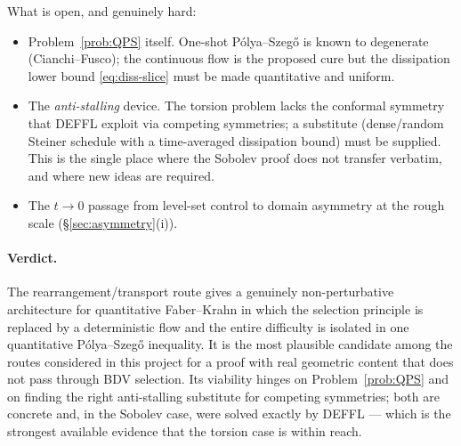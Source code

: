 \documentclass[11pt]{article}
\theoremstyle{definition}
\begin{document}
What is open, and genuinely hard:
\begin{itemize}[leftmargin=2em]
\item Problem~\ref{prob:QPS} itself. One-shot Pólya--Szegő is known to
degenerate (Cianchi--Fusco); the continuous flow is the proposed cure but the
dissipation lower bound \eqref{eq:diss-slice} must be made quantitative and
uniform.
\item The \emph{anti-stalling} device. The torsion problem lacks the
conformal symmetry that DEFFL exploit via competing symmetries; a substitute
(dense/random Steiner schedule with a time-averaged dissipation bound) must
be supplied. This is the single place where the Sobolev proof does not
transfer verbatim, and where new ideas are required.
\item The $t\to0$ passage from level-set control to domain asymmetry at the
rough scale (\S\ref{sec:asymmetry}(i)).
\end{itemize}

\paragraph{Verdict.} The rearrangement/transport route gives a genuinely
non-perturbative architecture for quantitative Faber--Krahn in which the
selection principle is replaced by a deterministic flow and the entire
difficulty is isolated in one quantitative Pólya--Szegő inequality. It is the
most plausible candidate among the routes considered in this project for a
proof with real geometric content that does not pass through BDV selection.
Its viability hinges on Problem~\ref{prob:QPS} and on finding the right
anti-stalling substitute for competing symmetries; both are concrete and, in
the Sobolev case, were solved exactly by DEFFL --- which is the strongest
available evidence that the torsion case is within reach.
\end{document}
